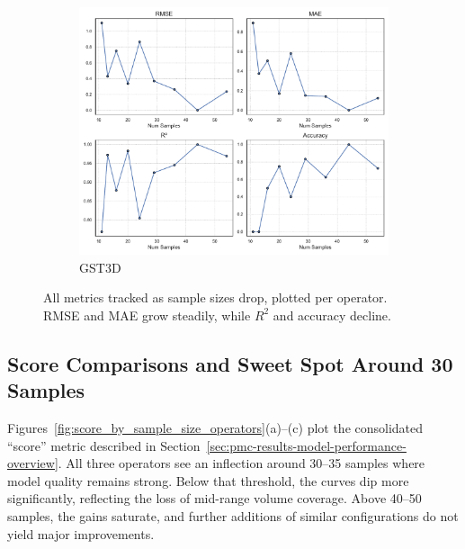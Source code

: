 \begin{figure}[htbp]
    \hfill
    \begin{subfigure}[t]{0.32\textwidth}
        \includegraphics[width=\textwidth]{assets/images/05/metrics_evolution_by_sample_size_gst3d}
        \caption{\ac{GST3D}}
    \end{subfigure}
    \caption{All metrics tracked as sample sizes drop, plotted per operator.
        \ac{RMSE} and \ac{MAE} grow steadily, while $R^2$ and accuracy decline.}
    \label{fig:metrics_evolution_sample_size_operators}
\end{figure}

\subsection{Score Comparisons and Sweet Spot Around 30 Samples}
\label{subsec:score-comparisons-and-sweet-spot}

Figures~\ref{fig:score_by_sample_size_operators}(a)–(c) plot the consolidated “score” metric described in Section~\ref{sec:pmc-results-model-performance-overview}.
All three operators see an inflection around 30–35 samples where model quality remains strong.
Below that threshold, the curves dip more significantly, reflecting the loss of mid-range volume coverage.
Above 40–50 samples, the gains saturate, and further additions of similar configurations do not yield major improvements.


